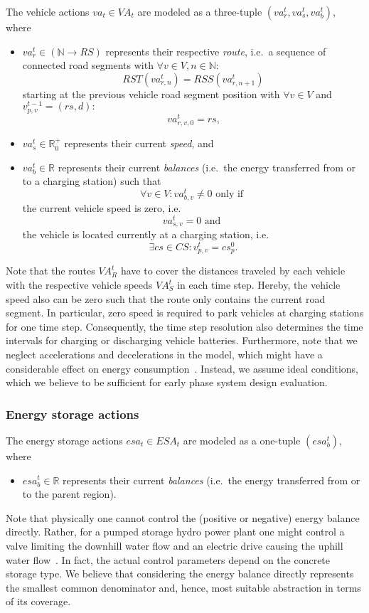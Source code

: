 The vehicle actions $va_t \in VA_t$ are modeled as a three-tuple $(va_r^t, va_s^t, va_b^t)$, where
\begin{itemize}
	\item $va_r^t \in (\mathbb{N} \rightarrow RS)$ represents their respective \textit{route}, i.e.\ a sequence of connected road segments with $\forall v \in V, n \in \mathbb{N}:$
	\[
		RST(va_{r,n}^t) = RSS(va_{r,n+1}^t)
	\]
	starting at the previous vehicle road segment position with $\forall v \in V$ and $v_{p,v}^{t-1} = (rs, d):$
	\[
		va_{r,v,0}^t = rs \textrm{,}
	\]
	\item $va_s^t \in \mathbb{R}_0^+$ represents their current \textit{speed}, and
	\item $va_b^t \in \mathbb{R}$ represents their current \textit{balances} (i.e.\ the energy transferred from or to a charging station) such that
	\[
		\forall v \in V: va_{b,v}^t \neq 0 \textrm{ only if }
	\]
	the current vehicle speed is zero, i.e.\
	\[
		 va_{s,v}^t = 0 \textrm{ and }
	\]
	the vehicle is located currently at a charging station, i.e.\
	\[
		\exists cs \in CS: v_{p,v}^t = cs_p^0 \textrm{.}
	\]
\end{itemize}
Note that the routes $VA_R^t$ have to cover the distances traveled by each vehicle with the respective vehicle speeds $VA_S^t$ in each time step. Hereby, the vehicle speed also can be zero such that the route only contains the current road segment. In particular, zero speed is required to park vehicles at charging stations for one time step. Consequently, the time step resolution also determines the time intervals for charging or discharging vehicle batteries. Furthermore, note that we neglect accelerations and decelerations in the model, which might have a considerable effect on energy consumption~\cite{gao2007modeling}. Instead, we assume ideal conditions, which we believe to be sufficient for early phase system design evaluation.

\subsubsection{Energy storage actions}
\label{actions_storages}

The energy storage actions $esa_t \in ESA_t$ are modeled as a one-tuple $(esa_b^t)$, where
\begin{itemize}
	\item $esa_b^t \in \mathbb{R}$ represents their current \textit{balances} (i.e.\ the energy transferred from or to the parent region).
\end{itemize}
Note that physically one cannot control the (positive or negative) energy balance directly. Rather, for a pumped storage hydro power plant one might control a valve limiting the downhill water flow and an electric drive causing the uphill water flow~\cite{Castronuovo2004}. In fact, the actual control parameters depend on the concrete storage type. We believe that considering the energy balance directly represents the smallest common denominator and, hence, most suitable abstraction in terms of its coverage.

